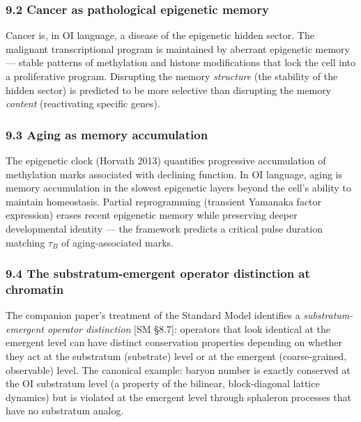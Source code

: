 \documentclass[
]{article}
\begin{document}
\hypertarget{cancer-as-pathological-epigenetic-memory}{%
\subsubsection{9.2 Cancer as pathological epigenetic
memory}\label{cancer-as-pathological-epigenetic-memory}}

Cancer is, in OI language, a disease of the epigenetic hidden sector.
The malignant transcriptional program is maintained by aberrant
epigenetic memory --- stable patterns of methylation and histone
modifications that lock the cell into a proliferative program.
Disrupting the memory \emph{structure} (the stability of the hidden
sector) is predicted to be more selective than disrupting the memory
\emph{content} (reactivating specific genes).

\hypertarget{aging-as-memory-accumulation}{%
\subsubsection{9.3 Aging as memory
accumulation}\label{aging-as-memory-accumulation}}

The epigenetic clock (Horvath 2013) quantifies progressive accumulation
of methylation marks associated with declining function. In OI language,
aging is memory accumulation in the slowest epigenetic layers beyond the
cell's ability to maintain homeostasis. Partial reprogramming (transient
Yamanaka factor expression) erases recent epigenetic memory while
preserving deeper developmental identity --- the framework predicts a
critical pulse duration matching \(\tau_B\) of aging-associated marks.

\hypertarget{the-substratum-emergent-operator-distinction-at-chromatin}{%
\subsubsection{9.4 The substratum-emergent operator distinction at
chromatin}\label{the-substratum-emergent-operator-distinction-at-chromatin}}

The companion paper's treatment of the Standard Model identifies a
\emph{substratum-emergent operator distinction} {[}SM §8.7{]}: operators
that look identical at the emergent level can have distinct conservation
properties depending on whether they act at the substratum (substrate)
level or at the emergent (coarse-grained, observable) level. The
canonical example: baryon number is exactly conserved at the OI
substratum level (a property of the bilinear, block-diagonal lattice
dynamics) but is violated at the emergent level through sphaleron
processes that have no substratum analog.
\end{document}
